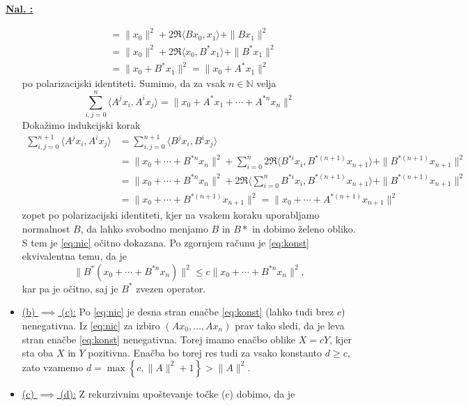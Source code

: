 \documentclass[a4paper, 12pt]{article}
\newcommand{\N}{\mathbb{N}}
\newcounter{excounter}[section]
\newenvironment{Exercise}
    {\refstepcounter{excounter}\underline{\textbf{Nal. \theexcounter:}}}
    {\par\vspace{\baselineskip}}
\begin{document}
\begin{Exercise}
\begin{itemize}
\begin{align*}
                &= \|x_0\|^2 + 2\Re\langle Bx_0, x_1\rangle + \|Bx_1\|^2 \\
                &= \|x_0\|^2 + 2\Re\langle x_0, B^*x_1\rangle + \|B^*x_1\|^2 \\
                &= \| x_0 + B^*x_1\|^2 = \| x_0 + A^*x_1 \|^2
            \end{align*}
            po polarizacijski identiteti.
            Sumimo, da za vsak $n \in \N$ velja
            \[
                \sum_{i,j=0}^n \langle A^jx_i, A^ix_j\rangle = \|x_0 + A^*x_1 + \cdots + A^{*n}x_n \|^2
            \]
            Dokažimo indukcijski korak
            \begin{align*}
                \sum_{i,j=0}^{n+1} \langle A^jx_i, A^ix_j \rangle
                &= \sum_{i,j=0}^{n+1} \langle B^jx_i, B^ix_j \rangle \\
                &= \|x_0 + \cdots + B^{*n}x_n\|^2 + \sum_{i = 0}^n 2\Re\langle B^{*i}x_i, B^{*(n+1)}x_{n+1} \rangle + \|B^{*(n+1)}x_{n+1}\|^2 \\
                &= \|x_0 + \cdots + B^{*n}x_n\|^2 +2\Re\langle  \sum_{i = 0}^n B^{*i}x_i,  B^{*(n+1)}x_{n+1} \rangle + \|B^{*(n+1)}x_{n+1}\|^2 \\
                &= \|x_0 + \cdots + B^{*(n+1)}x_{n+1}\|^2
                = \|x_0 + \cdots + A^{*(n+1)}x_{n+1}\|^2
            \end{align*}
            zopet po polarizacijski identiteti,
            kjer na vsakem koraku uporabljamo normalnost $B$,
            da lahko svobodno menjamo $B$ in $B*$ in dobimo želeno obliko.
            S tem je \eqref{eq:nic} očitno dokazana.
            Po zgornjem računu je \eqref{eq:konst} ekvivalentna temu, da je
            \[
                \| B^*(x_0 + \cdots + B^{*n}x_n) \|^2 \leq c \| x_0 + \cdots + B^{*n}x_n \|^2,
            \]
            kar pa je očitno, saj je $B^*$ zvezen operator.
        \item \underline{(b) $\implies$ (c):}
            Po \eqref{eq:nic} je desna stran enačbe \eqref{eq:konst} (lahko tudi brez $c$) nenegativna.
            Iz \eqref{eq:nic} za izbiro $(Ax_0,\dots,Ax_n)$ prav tako sledi,
            da je leva stran enačbe \eqref{eq:konst} nenegativna.
            Torej imamo enačbo oblike $X = cY$, kjer sta oba $X$ in $Y$ pozitivna.
            Enačba bo torej res tudi za vsako konstanto $d \geq c$,
            zato vzamemo $d = \max\left\{ c, \|A\|^2 + 1 \right\} > \|A\|^2$.
        \item \underline{(c) $\implies$ (d):}
            Z rekurzivnim upoštevanje točke (c) dobimo, da je

\end{itemize}
\end{Exercise}
\end{document}
